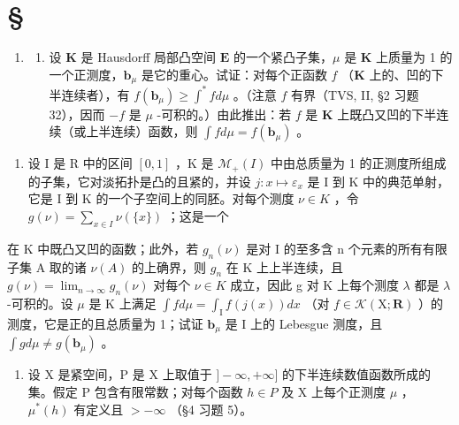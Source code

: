 \section*{\texorpdfstring{\S\CurrentExerciseGroup}{第{\CurrentExerciseGroup}节}}
{}

\begin{enumerate}
\def\labelenumi{\arabic{enumi})}
\tightlist
\item
  \begin{enumerate}
  \def\labelenumii{\alph{enumii})}
  \tightlist
  \item
    设 \(\mathbf{K}\) 是 Hausdorff 局部凸空间 \(\mathbf{E}\) 的一个紧凸子集，\(\mu\) 是 \(\mathbf{K}\) 上质量为 1 的一个正测度，\(\mathbf{b}_{\mu}\) 是它的重心。试证：对每个正函数 \(f\) （\(\mathbf{K}\) 上的、凹的下半连续者），有 \(f(\mathbf{b}_{\mu}) \geqslant \int^{*} f d\mu\) 。（注意 \(f\) 有界（TVS, II, §2 习题 32），因而 \(-f\) 是 \(\mu\) -可积的。）由此推出：若 \(f\) 是 \(\mathbf{K}\) 上既凸又凹的下半连续（或上半连续）函数，则 \(\int f d\mu = f(\mathbf{b}_{\mu})\) 。
  \end{enumerate}
\end{enumerate}

\begin{enumerate}
\def\labelenumi{\alph{enumi})}
\setcounter{enumi}{1}
\tightlist
\item
  设 I 是 R 中的区间 \([0,1]\) ，K 是 \(\mathcal{M}_{+}(I)\) 中由总质量为 1 的正测度所组成的子集，它对淡拓扑是凸的且紧的，并设 \(j: x \mapsto \varepsilon_{x}\) 是 I 到 K 中的典范单射，它是 I 到 K 的一个子空间上的同胚。对每个测度 \(\nu \in K\) ，令 \(g(\nu) = \sum_{x \in I} \nu(\{x\})\) ；这是一个
\end{enumerate}

在 K 中既凸又凹的函数；此外，若 \(g_{n}(\nu)\) 是对 I 的至多含 n 个元素的所有有限子集 A 取的诸 \(\nu(A)\) 的上确界，则 \(g_{n}\) 在 K 上上半连续，且 \(g(\nu) = \lim_{n \to \infty} g_{n}(\nu)\) 对每个 \(\nu \in K\) 成立，因此 g 对 K 上每个测度 \(\lambda\) 都是 \(\lambda\) -可积的。设 \(\mu\) 是 K 上满足 \(\int f d\mu = \int_{\mathrm{I}} f(j(x)) dx\) （对 \(f \in \mathcal{K}(\mathrm{X}; \mathbf{R})\) ）的测度，它是正的且总质量为 1；试证 \(\mathbf{b}_{\mu}\) 是 I 上的 Lebesgue 测度，且 \(\int g d\mu \neq g(\mathbf{b}_{\mu})\) 。

\begin{enumerate}
\def\labelenumi{\arabic{enumi})}
\setcounter{enumi}{1}
\tightlist
\item
  设 X 是紧空间，P 是 X 上取值于 \(]-\infty,+\infty]\) 的下半连续数值函数所成的集。假定 P 包含有限常数；对每个函数 \(h\in P\) 及 X 上每个正测度 \(\mu\) ，\(\mu^{*}(h)\) 有定义且 \(>-\infty\) （§4 习题 5）。
\end{enumerate}

